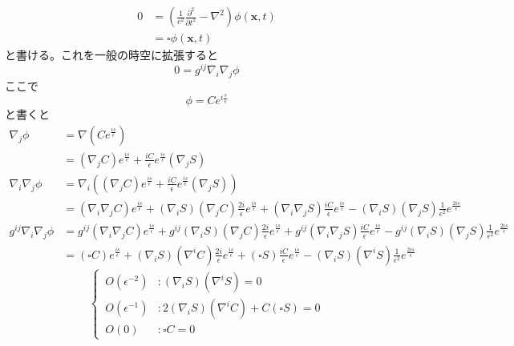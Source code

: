 \documentclass[dvipdfmx]{report} %
\begin{document}
\begin{equation*}
\begin{split}
	0 &= \left( \frac{1}{c^2}\frac{\partial^2}{\partial t^2} - \nabla^2 \right)\phi(\bm{x}, t)\\
	&= \square \phi(\bm{x}, t)
\end{split}
\end{equation*}
と書ける。これを一般の時空に拡張すると
\[ 0 = g^{ij} \nabla_i \nabla_j \phi \]
ここで
\[ \phi = Ce^{i\frac{s}{\epsilon}} \] 
と書くと
\begin{equation*}
\begin{split}
	\nabla_j \phi &= \nabla \left( Ce^{\frac{is}{\epsilon}} \right)\\
	&= \left( \nabla_j C \right) e^{\frac{is}{\epsilon}} + \frac{iC}{\epsilon} e^{\frac{is}{\epsilon}} \left( \nabla_j S \right)\\
	\nabla_i \nabla_j \phi &= \nabla_i \left(  \left( \nabla_j C \right) e^{\frac{is}{\epsilon}} + \frac{iC}{\epsilon} e^{\frac{is}{\epsilon}} \left( \nabla_j S \right) \right)\\
	&= \left( \nabla_i \nabla_j C \right) e^{\frac{is}{\epsilon}} + \left( \nabla_i S \right) \left( \nabla_j C \right) \frac{2i}{\epsilon} e^{\frac{is}{\epsilon}} + \left( \nabla_i \nabla_j S \right) \frac{iC}{\epsilon} e^{\frac{is}{\epsilon}} -  \left( \nabla_i S \right) \left( \nabla_j S \right) \frac{1}{\epsilon^2} e^{\frac{2is}{\epsilon}}\\
	g^{ij} \nabla_i \nabla_j \phi &= g^{ij}\left( \nabla_i \nabla_j C \right) e^{\frac{is}{\epsilon}} + g^{ij}\left( \nabla_i S \right) \left( \nabla_j C \right) \frac{2i}{\epsilon} e^{\frac{is}{\epsilon}} + g^{ij}\left( \nabla_i \nabla_j S \right) \frac{iC}{\epsilon} e^{\frac{is}{\epsilon}} -  g^{ij}\left( \nabla_i S \right) \left( \nabla_j S \right) \frac{1}{\epsilon^2} e^{\frac{2is}{\epsilon}}\\
	&= \left( \square C \right) e^{\frac{is}{\epsilon}} + \left( \nabla_i S \right) \left( \nabla^i C \right) \frac{2i}{\epsilon} e^{\frac{is}{\epsilon}} + \left( \square S \right) \frac{iC}{\epsilon} e^{\frac{is}{\epsilon}} -  \left( \nabla_i S \right) \left( \nabla^i S \right) \frac{1}{\epsilon^2} e^{\frac{2is}{\epsilon}}
\end{split}
\end{equation*}
\begin{equation}
\left\{ \,
\begin{aligned}
	O(\epsilon^{-2}) &: \left( \nabla_i S \right) \left( \nabla^i S \right) = 0\\
	O(\epsilon^{-1}) &: 2 \left( \nabla_i S \right) \left( \nabla^i C \right) + C \left( \square S \right) = 0\\
	O(0) &: \square C = 0
\end{aligned}
\right.
\end{equation}
\end{document}
